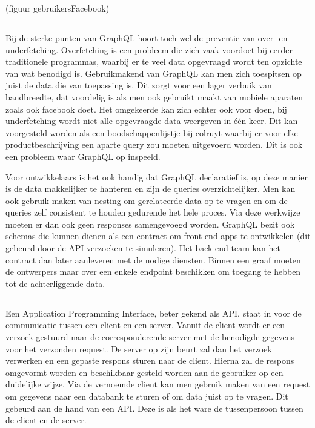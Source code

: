(figuur gebruikersFacebook)

\subsection{}%
\label{sec:Gebruik}
Bij de sterke punten van GraphQL hoort toch wel de preventie van over- en underfetching. Overfetching is een probleem die zich vaak voordoet bij eerder traditionele programmas, waarbij er te veel data opgevraagd wordt ten opzichte van wat benodigd is. Gebruikmakend van GraphQL kan men zich toespitsen op juist de data die van toepassing is. Dit zorgt voor een lager verbuik van bandbreedte, dat voordelig is als men ook gebruikt maakt van mobiele aparaten zoals ook facebook doet. Het omgekeerde kan zich echter ook voor doen, bij underfetching wordt niet alle opgevraagde data weergeven in één keer. Dit kan voorgesteld worden als een boodschappenlijstje bij colruyt waarbij er voor elke productbeschrijving een aparte query zou moeten uitgevoerd worden. Dit is ook een probleem waar GraphQL op inspeeld.

Voor ontwikkelaars is het ook handig dat GraphQL declaratief is, op deze manier is de data makkelijker te hanteren en zijn de queries overzichtelijker. Men kan ook gebruik maken van nesting om gerelateerde data op te vragen en om de queries zelf consistent te houden gedurende het hele proces. Via deze werkwijze moeten er dan ook geen responses samengevoegd worden. GraphQL bezit ook schemas die kunnen dienen als een contract om front-end apps te ontwikkelen (dit gebeurd door de API verzoeken te simuleren). Het back-end team kan het contract dan later aanleveren met de nodige diensten. Binnen een graaf moeten de ontwerpers maar over een enkele endpoint beschikken om toegang te hebben tot de achterliggende data.

\subsection{}%
\label{sec:API}
Een Application Programming Interface, beter gekend als API, staat in voor de communicatie tussen een client en een server. Vanuit de client wordt er een verzoek gestuurd naar de corresponderende server met de benodigde gegevens voor het verzonden request. De server op zijn beurt zal dan het verzoek verwerken en een gepaste respons sturen naar de client. Hierna zal de respons omgevormt worden en beschikbaar gesteld worden aan de gebruiker op een duidelijke wijze. Via de vernoemde client kan men gebruik maken van een request om gegevens naar een databank te sturen of om data juist op te vragen. Dit gebeurd aan de hand van een API. Deze is als het ware de tussenpersoon tussen de client en de server. \autocite{Willem2021}
